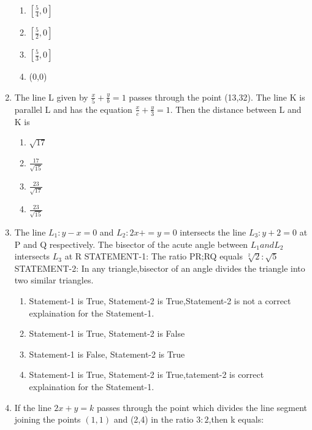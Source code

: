 \documentclass[12pt]{article}
\begin{document}
\begin{enumerate}
\begin{enumerate}
\item $[\frac{5}{4} ,0]$ 
\item $[\frac{5}{2} ,0]$ 
\item$[\frac{5}{3} ,0] $
\item (0,0)
\end{enumerate}
\item The line L given by $\frac{x}{5}+\frac{y}{b}=1$ passes through the point (13,32). The line K is parallel L and has the equation $\frac{x}{c}+\frac{y}{3}=1$. Then the distance between L and K is 
\begin{enumerate}
\item $\sqrt{17}$  
\item$\frac{17}{\sqrt{15}}$ 
\item$\frac{23}{\sqrt{17}}$ 
\item $\frac{23}{\sqrt{15}}$
\end{enumerate}
\item The line $L_1:y-x=0$ and $L_2: 2x+=y=0$ intersects the line $L_3: y+2=0$ at P and Q respectively. The bisector of the acute angle between $L_1 and L_2$ intersects $L_3$ at R
STATEMENT-1: The ratio PR;RQ equals $\sqrt[2]{2}:\sqrt{5}$\\
 STATEMENT-2: In any triangle,bisector of an angle divides the triangle into two similar triangles.
 \begin{enumerate}
\item Statement-1 is True, Statement-2 is True,Statement-2 is not a correct explaination for the Statement-1.
\item Statement-1 is True, Statement-2 is False
\item Statement-1 is False, Statement-2 is True
\item Statement-1 is True, Statement-2 is True,tatement-2 is correct explaination for the Statement-1.
\end{enumerate}
\item  If the line $2x +y=k$ passes through the point which divides the line segment joining the points $(1,1)$ and (2,4) in the ratio $3:2$,then k equals:


\end{enumerate}
\end{document}
